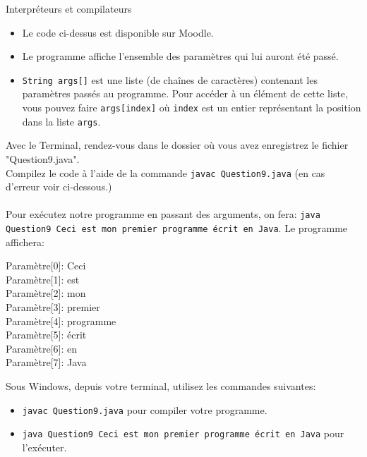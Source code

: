 \begin{section}{Interpréteurs et compilateurs}
\begin{Exercice}[10 minutes]
        \begin{conseil}
            \begin{itemize}
                \item Le code ci-dessus est disponible sur Moodle.
                \item Le programme affiche l'ensemble des paramètres qui lui auront été passé.
                \item \lstinline{String args[]} est une liste (de chaînes de caractères) contenant les paramètres passés au programme. Pour accéder à un élément de cette liste, vous pouvez faire \lstinline{args[index]} où \lstinline{index} est un entier représentant la position dans la liste \lstinline{args}.
            \end{itemize}
        \end{conseil}
        \begin{solution}
            Avec le Terminal, rendez-vous dans le dossier où vous avez enregistrez le fichier "Question9.java".\\
            Compilez le code à l'aide de la commande \lstinline{javac Question9.java} (en cas d'erreur voir ci-dessous.)\\\\
            Pour exécutez notre programme en passant des arguments, on fera: \lstinline{java Question9 Ceci est mon premier programme écrit en Java}. Le programme affichera:\\
            \parbox{\textwidth}{
                Paramètre[0]: Ceci\\
                Paramètre[1]: est\\
                Paramètre[2]: mon\\
                Paramètre[3]: premier\\
                Paramètre[4]: programme\\
                Paramètre[5]: écrit\\
                Paramètre[6]: en\\
                Paramètre[7]: Java\\
            }
            Sous Windows, depuis votre terminal, utilisez les commandes suivantes:
            \begin{itemize}
                \item \lstinline{javac Question9.java} pour compiler votre programme.
                \item \lstinline{java Question9 Ceci est mon premier programme écrit en Java} pour l'exécuter.\\
            \end{itemize}


\end{solution}
\end{Exercice}
\end{section}

